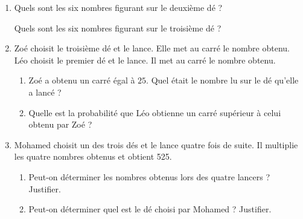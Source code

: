 \documentclass[10pt]{article}
\begin{document}
\begin{enumerate}
\item Quels sont les six nombres figurant sur le deuxième dé ? 

Quels sont les six nombres figurant sur le troisième dé ?
\item  Zoé choisit le troisième dé et le lance. Elle met au carré le nombre obtenu.
Léo choisit le premier dé et le lance. Il met au carré le nombre obtenu.
	\begin{enumerate}
		\item Zoé a obtenu un carré égal à $25$. Quel était le nombre lu sur le dé qu'elle a lancé ?
		\item Quelle est la probabilité que Léo obtienne un carré supérieur à celui obtenu par Zoé ?
 	\end{enumerate}
\item  Mohamed choisit un des trois dés et le lance quatre fois de suite. Il multiplie les quatre nombres obtenus et obtient 525.
	\begin{enumerate}
		\item Peut-on déterminer les nombres obtenus lors des quatre lancers ? Justifier.
		\item Peut-on déterminer quel est le dé choisi par Mohamed ? Justifier.
 	\end{enumerate}
\end{enumerate}

\bigskip
\end{document}
